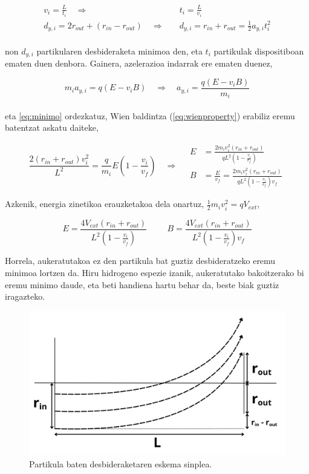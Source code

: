 \documentclass[12pt]{article}
\numberwithin{figure}{section}
\numberwithin{equation}{section}
\begin{document}
\begin{equation}
    \begin{aligned}
        v_i = \frac{L}{t_i} \quad \Longrightarrow& \quad t_i =\frac{L}{v_i}\\
        d_{y,i} = 2r_{out}+(r_{in}-r_{out}) \quad \Longrightarrow& \quad d_{y,i} =r_{in}+r_{out}= \frac{1}{2}a_{y,i}t_i^2
    \end{aligned}
    \label{eq:minimo}
\end{equation}
\\
non $d_{y,i}$ partikularen desbideraketa minimoa den, eta $t_i$ partikulak dispositiboan ematen duen denbora. Gainera, azelerazioa indarrak ere ematen duenez,

\begin{equation}
    m_i a_{y,i}=q(E-v_iB) \quad \Longrightarrow \quad a_{y,i}=\frac{q(E-v_iB)}{m_i}
\end{equation}
\\
eta \ref{eq:minimo} ordezkatuz, Wien baldintza (\ref{eq:wienproperty}) erabiliz eremu batentzat askatu daiteke,

\begin{equation}
    \frac{2(r_{in}+r_{out})v_i^2}{L^2}=\frac{q}{m_i}E(1-\frac{v_i}{v_f}) \quad \Longrightarrow \quad \begin{aligned}
        E&=\frac{2m_iv_i^2(r_{in}+r_{out})}{qL^2(1-\frac{v_i}{v_f})}\\
        B&=\frac{E}{v_f}=\frac{2m_iv_i^2(r_{in}+r_{out})}{qL^2(1-\frac{v_i}{v_f})v_f}
    \end{aligned}
\end{equation}

Azkenik, energia zinetikoa erauzketakoa dela onartuz, $\frac{1}{2}m_iv_i^2=qV_{ext}$,

\begin{equation}
    \boxed{
    E=\frac{4V_{ext}(r_{in}+r_{out})}{L^2(1-\frac{v_i}{v_f})} \hspace{1cm} B=\frac{4V_{ext}(r_{in}+r_{out})}{L^2(1-\frac{v_i}{v_f})v_f}
    }
    \label{eq:desbiderapena}
\end{equation}

Horrela, aukeratutakoa ez den partikula bat guztiz desbideratzeko eremu minimoa lortzen da. Hiru hidrogeno espezie izanik, aukeratutako bakoitzerako bi eremu minimo daude, eta beti handiena hartu behar da, beste biak guztiz iragazteko. 
\begin{figure}[h]
    \centering
    \includegraphics[width=0.5\linewidth]{2 - Oinarri teorikoa/desbideraketa_eskema.png}
    \caption{Partikula baten desbideraketaren eskema sinplea.}
    \label{fig:desbideraketa_eskema}
\end{figure}
\newpage
\end{document}
